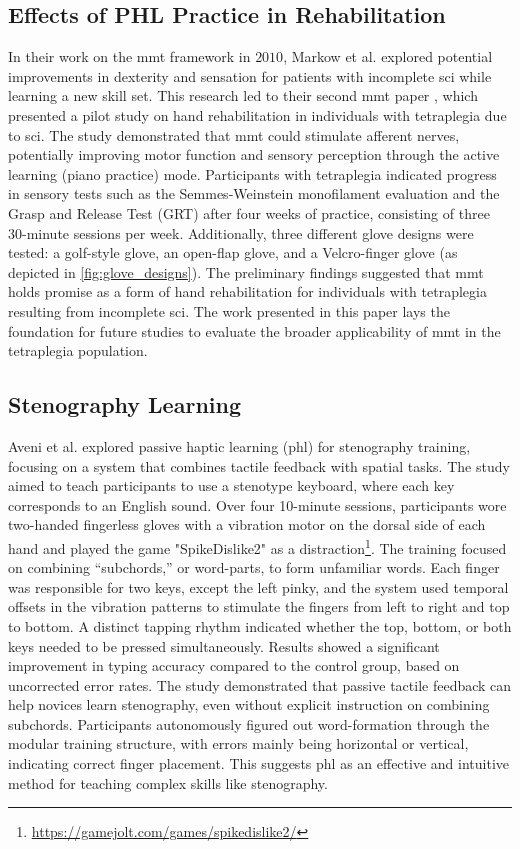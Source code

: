 \subsection{Effects of PHL Practice in Rehabilitation}
In their work on the \gls{mmt} framework in $2010$, Markow et al. explored potential improvements in dexterity and sensation for patients with incomplete \gls{sci} while learning a new skill set. This research led to their second \gls{mmt} paper \cite{Markow2010}, which presented a pilot study on hand rehabilitation in individuals with tetraplegia due to \gls{sci}.
The study demonstrated that \gls{mmt} could stimulate afferent nerves, potentially improving motor function and sensory perception through the active learning (piano practice) mode. Participants with tetraplegia indicated progress in sensory tests such as the Semmes-Weinstein monofilament evaluation and the Grasp and Release Test (GRT) after four weeks of practice, consisting of three 30-minute sessions per week. Additionally, three different glove designs were tested: a golf-style glove, an open-flap glove, and a Velcro-finger glove (as depicted in \autoref{fig:glove_designs}).
The preliminary findings suggested that \gls{mmt} holds promise as a form of hand rehabilitation for individuals with tetraplegia resulting from incomplete \gls{sci}. The work presented in this paper lays the foundation for future studies to evaluate the broader applicability of \gls{mmt} in the tetraplegia population.


\subsection{Stenography Learning}

Aveni et al. \cite{Aveni2019} explored passive haptic learning (\gls{phl}) for stenography training, focusing on a system that combines tactile feedback with spatial tasks. The study aimed to teach participants to use a stenotype keyboard, where each key corresponds to an English sound. Over four 10-minute sessions, participants wore two-handed fingerless gloves with a vibration motor on the dorsal side of each hand and played the game "SpikeDislike2" as a distraction\footnote{\url{https://gamejolt.com/games/spikedislike2/}}.
The training focused on combining “subchords,” or word-parts, to form unfamiliar words. Each finger was responsible for two keys, except the left pinky, and the system used temporal offsets in the vibration patterns to stimulate the fingers from left to right and top to bottom. A distinct tapping rhythm indicated whether the top, bottom, or both keys needed to be pressed simultaneously.
Results showed a significant improvement in typing accuracy compared to the control group, based on uncorrected error rates.
The study demonstrated that passive tactile feedback can help novices learn stenography, even without explicit instruction on combining subchords. Participants autonomously figured out word-formation through the modular training structure, with errors mainly being horizontal or vertical, indicating correct finger placement. This suggests \gls{phl} as an effective and intuitive method for teaching complex skills like stenography.
